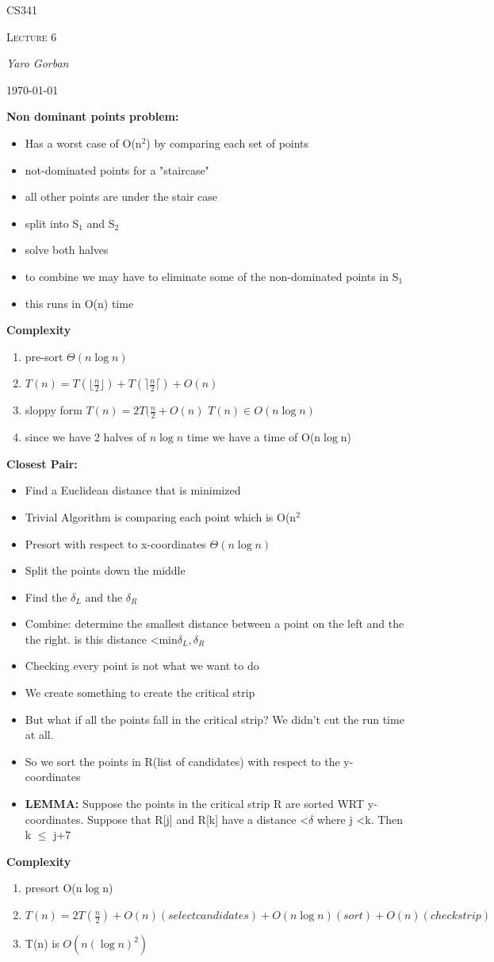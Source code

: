 \documentclass[12pt,a4paper]{report}
\begin{document}
	\centering
	{\scshape\LARGE CS341 \par}
	{\scshape\Large Lecture 6\par}
	{\Large\itshape Yaro Gorban\par}
	{\large \today\par}
	\vspace{1.5cm}

\textbf{Non dominant points problem:}
\begin{itemize}
\item Has a worst case of O(n$^2$) by comparing each set of points
\item not-dominated points for a "staircase"
\item all other points are under the stair case
\item split into S$_1$ and S$_2$
\item solve both halves
\item to combine we may have to eliminate some of the non-dominated points in S$_1$
\item this runs in O(n) time
\end{itemize}
\textbf{Complexity}
\begin{enumerate}
\item pre-sort $\Theta(n\log n)$
\item $T(n) = T(\lfloor \frac{n}{2} \rfloor) + T(\rceil \frac{n}{2} \lceil) + O(n)$
\item sloppy form $T(n) = 2T(\frac{n}{2} + O(n)$ $T(n) \in O(n\log n)$
\item since we have 2 halves of $n\log n$ time we have a time of O(n$\log$n)
\end{enumerate}
\textbf{Closest Pair:}
\begin{itemize}
\item Find a Euclidean distance that is minimized
\item Trivial Algorithm is comparing each point which is O(n$^2$
\item Presort with respect to x-coordinates $\Theta(n\log n)$
\item Split the points down the middle
\item Find the $\delta_L$ and the $\delta_R$
\item Combine: determine the smallest distance between a point on the left and the the right. is this distance 
\textless min{$\delta_L, \delta_R$} 
\item Checking every point is not what we want to do
\item We create something to create the critical strip
\item But what if all the points fall in the critical strip? We didn't cut the run time at all.
\item So we sort the points in R(list of candidates) with respect to the y-coordinates
\item \textbf{LEMMA:} Suppose the points in the critical strip R are sorted WRT y-coordinates. Suppose that R[j] and R[k] have a distance \textless $\delta$ where j \textless k. Then k $\leq$ j+7
\end{itemize}
\textbf{Complexity}
\begin{enumerate}
\item presort O(n$\log$n)
\item $T(n) = 2T(\frac{n}{2}) + O(n)(select candidates) + O(n\log n)(sort) + O(n) (checkstrip)$
\item T(n) is $O(n(\log n)^2)$
\end{enumerate}
\end{document}
